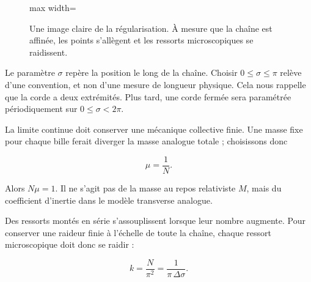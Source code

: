 \begin{figure}[H]
  \centering
  \begin{adjustbox}{max width=\linewidth}
  \end{adjustbox}
  \caption{Une image claire de la régularisation. À mesure que la chaîne est affinée, les points s’allègent et les ressorts microscopiques se raidissent.}
  \label{fig:l02-chain-redraw}
\end{figure}

Le paramètre \(\sigma\) repère la position le long de la chaîne. Choisir \(0\leq\sigma\leq\pi\) relève d’une convention, et non d’une mesure de longueur physique. Cela nous rappelle que la corde a deux extrémités. Plus tard, une corde fermée sera paramétrée périodiquement sur \(0\leq\sigma<2\pi\).

La limite continue doit conserver une mécanique collective finie. Une masse fixe pour chaque bille ferait diverger la masse analogue totale ; choisissons donc

\begin{equation}
  \mu=\frac{1}{N}.
  \label{eq:l02-mu-scaling}
\end{equation}

Alors \(N\mu=1\). Il ne s’agit pas de la masse au repos relativiste \(M\), mais du coefficient d’inertie dans le modèle transverse analogue.

Des ressorts montés en série s’assouplissent lorsque leur nombre augmente. Pour conserver une raideur finie à l’échelle de toute la chaîne, chaque ressort microscopique doit donc se raidir :

\begin{equation}
  k=\frac{N}{\pi^2}
  =\frac{1}{\pi\,\Delta\sigma}.
  \label{eq:l02-k-scaling}
\end{equation}

